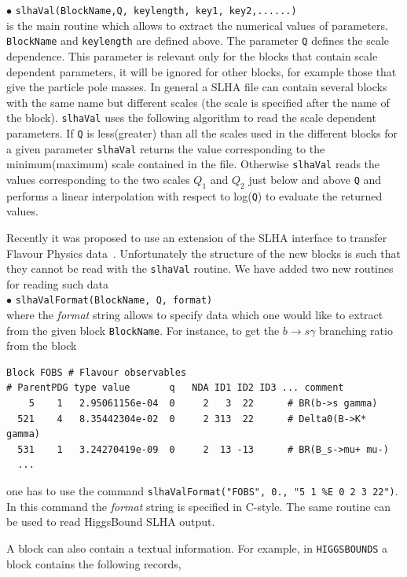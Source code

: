 \documentclass[12pt,a4paper]{article}
\begin{document}
\noindent
$\bullet$ \verb|slhaVal(BlockName,Q, keylength, key1, key2,......)|\\
is the main routine which allows to  extract the  numerical values of parameters.
\verb|BlockName| and \verb|keylength| are defined above.
The parameter \verb|Q| defines  the scale dependence. 
This parameter is relevant only for the blocks that contain scale dependent parameters, it will be ignored for other
blocks, for example those that give the particle pole masses. 
In general a SLHA file can contain several blocks with 
the same name but different scales (the scale is specified after the name of the block).
\verb|slhaVal| uses the following algorithm to read the scale dependent parameters. 
If \verb|Q| is less(greater) than all the  scales used in the different blocks for a given parameter 
\verb|slhaVal| returns the value corresponding to the minimum(maximum) scale contained in the file.
Otherwise \verb|slhaVal| reads the values corresponding to the two scales $Q_1$ and $Q_2$ just below and above
\verb|Q| and performs a linear interpolation with respect to log(\verb|Q|) to evaluate the 
returned values.


Recently it was  proposed to use an extension of the SLHA interface
to transfer Flavour Physics data~\cite{Mahmoudi:2010iz}. Unfortunately the structure of the new blocks 
is such that they cannot be read with the {\tt slhaVal} routine. We have added 
two new routines for reading such data\\
\noindent
$\bullet$ \verb|slhaValFormat(BlockName, Q, format)|\\
where the {\it format} string allows to specify data which one would like 
to extract from the given block {\tt BlockName}. For instance, to get the $b\rightarrow s\gamma$ branching ratio 
from the block 
\begin{verbatim}
Block FOBS # Flavour observables
# ParentPDG type value       q   NDA ID1 ID2 ID3 ... comment
    5    1   2.95061156e-04  0     2   3  22      # BR(b->s gamma)
  521    4   8.35442304e-02  0     2 313  22      # Delta0(B->K* gamma)
  531    1   3.24270419e-09  0     2  13 -13      # BR(B_s->mu+ mu-)
  ...
\end{verbatim}
one has to use the command \verb|slhaValFormat("FOBS", 0., "5 1 %E 0 2 3 22")|.
In this command  the {\it format} string is specified in C-style. The same routine can be used 
to read  HiggsBound SLHA output.

 
A block can also contain a textual information. For example, in
{\tt HIGGSBOUNDS} a block  contains the following records, 
\end{document}
